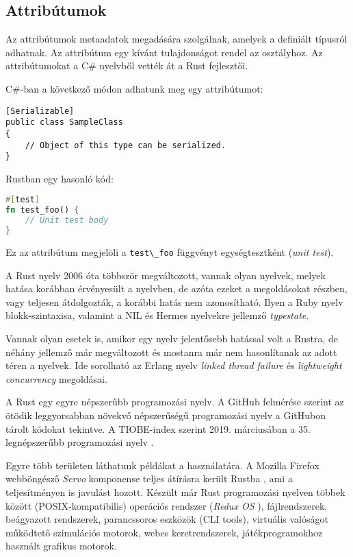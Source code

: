 \subsection{Attribútumok}
Az attribútumok metaadatok megadására szolgálnak, amelyek a definiált típusról adhatnak. Az attribútum egy kívánt tulajdonságot rendel az osztályhoz. Az attribútumokat a C\# nyelvből vették át a Rust fejlesztői.

C\#-ban a következő módon adhatunk meg egy attribútumot:
\begin{lstlisting}
[Serializable]
public class SampleClass
{
    // Object of this type can be serialized.
}
\end{lstlisting}
Rustban egy hasonló kód:
\begin{lstlisting}[language=Rust, style=boxed]
#[test]
fn test_foo() {
    // Unit test body
}
\end{lstlisting}
Ez az attribútum megjelöli a \lstinline{test\_foo} függvényt egységtesztként (\textit{unit test}).


A Rust nyelv 2006 óta többször megváltozott, vannak olyan nyelvek, melyek hatása korábban érvényesült a nyelvben, de azóta ezeket a megoldásokat részben, vagy teljesen átdolgozták, a korábbi hatás nem azonosítható. Ilyen a Ruby nyelv blokk-szintaxisa, valamint a NIL és Hermes nyelvekre jellemző \textit{typestate}.

Vannak olyan esetek is, amikor egy nyelv jelentősebb hatással volt a Rustra, de néhány jellemző már megváltozott és mostanra már nem hasonlítanak az adott téren a nyelvek. Ide sorolható az Erlang nyelv \textit{linked thread failure} és \textit{lightweight concurrency} megoldásai.

A Rust egy egyre népszerűbb programozási nyelv. A GitHub felmérése szerint az ötödik leggyorsabban növekvő népszerűségű programozási nyelv a GitHubon tárolt kódokat tekintve. A TIOBE-index szerint 2019. márciusában a 35. legnépszerűbb programozási nyelv \cite{tiobeindex}.

Egyre több területen láthatunk példákat a használatára. A Mozilla Firefox webböngésző \textit{Servo} komponense teljes átírásra került Rustba \cite{servo}, ami a teljesítményen is javulást hozott. Készült már Rust programozási nyelven többek között (POSIX-kompatibilis) operációs rendszer (\textit{Redux OS} \cite{redox}), fájlrendszerek, beágyazott rendszerek, parancssoros eszközök (CLI tools), virtuális valóságot működtető szimulációs motorok, webes keretrendszerek, játékprogramokhoz használt grafikus motorok.
